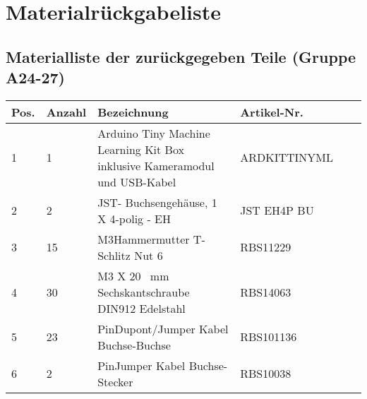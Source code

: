 \documentclass[12pt,a4paper]{scrbook}
\begin{document}
	
	\chapter{Materialrückgabeliste}
	
	\section{Materialliste der zurückgegeben Teile (Gruppe A24-27)}
		
\fontsize{8}{10}\selectfont
\begin{tabularx}{\textwidth}{|p{0.4cm}|p{1cm}|X|X|p{1cm}|X|}
	\hline 
	\textbf{Pos.}  & \textbf{Anzahl} & \textbf{Bezeichnung} & \textbf{Artikel-Nr.}   \\ \hline
	1 & 1 & Arduino Tiny Machine Learning Kit Box inklusive Kameramodul und USB-Kabel & ARDKITTINYML  \\
	\hline
	2 & 2 & JST- Buchsengehäuse, 1 X 4-polig - EH & JST EH4P BU  \\
	\hline
	3 & 15  & M3Hammermutter T-Schlitz Nut 6 &  RBS11229 \\
	\hline
	4 & 30 & M3 X 20 \ mm Sechskantschraube DIN912 Edelstahl & RBS14063 \\
	\hline
	5 & 23 & PinDupont/Jumper Kabel  Buchse-Buchse  & RBS101136 \\
	\hline
	6 & 2 &PinJumper Kabel Buchse-Stecker & RBS10038 \\
	\hline
	
\end{tabularx}
	
\end{document}
